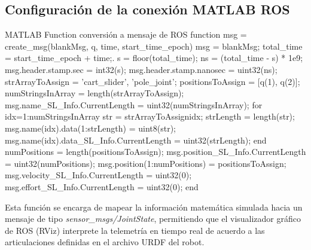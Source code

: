 \documentclass[11pt,fleqn]{book} %
\begin{document}
\subsection{Configuración de la conexión MATLAB ROS}
\label{ap:conexion_ROS}

\begin{matlabbox}{MATLAB Function conversión a mensaje de ROS}
function msg = create_msg(blankMsg, q, time, start_time_epoch)
	msg = blankMsg;
	total_time = start_time_epoch + time;.
	s = floor(total_time);
	ns = (total_time - s) * 1e9; 
	msg.header.stamp.sec = int32(s);
	msg.header.stamp.nanosec = uint32(ns);
	strArrayToAssign = {'cart_slider', 'pole_joint'};
	positionsToAssign = [q(1), q(2)];
	numStringsInArray = length(strArrayToAssign);
	msg.name_SL_Info.CurrentLength = uint32(numStringsInArray);
	for idx=1:numStringsInArray
		str = strArrayToAssign{idx};
		strLength = length(str);
		msg.name(idx).data(1:strLength) = uint8(str);
		msg.name(idx).data_SL_Info.CurrentLength = uint32(strLength);
	end
	numPositions = length(positionsToAssign);
	msg.position_SL_Info.CurrentLength = uint32(numPositions);
	msg.position(1:numPositions) = positionsToAssign;
	msg.velocity_SL_Info.CurrentLength = uint32(0);
	msg.effort_SL_Info.CurrentLength = uint32(0);
end
\end{matlabbox}

Esta función se encarga de mapear la información matemática simulada hacia un mensaje de tipo \textit{sensor\_msgs/JointState}, permitiendo que el visualizador gráfico de ROS (RViz) interprete la telemetría en tiempo real de acuerdo a las articulaciones definidas en el archivo URDF del robot.
\end{document}

